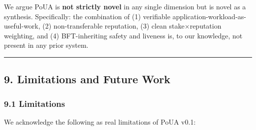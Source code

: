 \documentclass[
  11pt,
]{article}
\begin{document}
We argue PoUA is \textbf{not strictly novel} in any single dimension but
is novel as a synthesis. Specifically: the combination of (1) verifiable
application-workload-as-useful-work, (2) non-transferable reputation,
(3) clean stake\(\times\)reputation weighting, and (4) BFT-inheriting
safety and liveness is, to our knowledge, not present in any prior
system.

\begin{center}\rule{0.5\linewidth}{0.5pt}\end{center}

\subsection{9. Limitations and Future
Work}\label{limitations-and-future-work}

\subsubsection{9.1 Limitations}\label{limitations}

We acknowledge the following as real limitations of PoUA v0.1:
\end{document}
